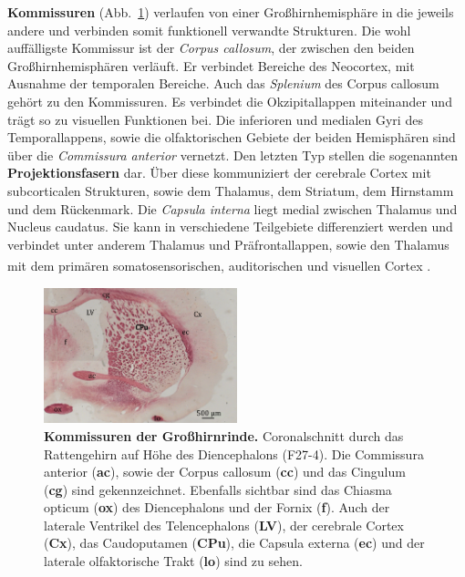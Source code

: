 \documentclass[12pt,a4paper,pdftex]{article}
\begin{document}
\noindent \textbf{Kommissuren} (Abb.~\ref{fig:faser_cortico-cortical}) verlaufen von einer Großhirnhemisphäre in die jeweils andere und verbinden somit funktionell verwandte Strukturen. Die wohl auffälligste Kommissur ist der \textit{Corpus callosum}, der zwischen den beiden Großhirnhemisphären verläuft. Er verbindet Bereiche des Neocortex, mit Ausnahme der temporalen Bereiche. Auch das \textit{Splenium} des Corpus callosum gehört zu den Kommissuren. Es verbindet die Okzipitallappen miteinander und trägt so zu visuellen Funktionen bei. Die inferioren und medialen Gyri des Temporallappens, sowie die olfaktorischen Gebiete der beiden Hemisphären sind über die \textit{Commissura anterior} vernetzt. Den letzten Typ stellen die sogenannten \textbf{Projektionsfasern} dar. Über diese kommuniziert der cerebrale Cortex mit subcorticalen Strukturen, sowie dem Thalamus, dem Striatum, dem Hirnstamm und dem Rückenmark. Die \textit{Capsula interna} liegt  medial zwischen Thalamus und Nucleus caudatus. Sie kann in verschiedene Teilgebiete differenziert werden und verbindet unter anderem Thalamus und Präfrontallappen, sowie den Thalamus mit dem primären somatosensorischen, auditorischen und visuellen Cortex \textsuperscript{\cite[13]{crossman2014neuroanatomy}}.

\begin{figure}[H]
    \centering
    \includegraphics[width=0.5\textwidth]{pictures/Bilder_Jule/Ratte/faser_cortex.png}
    \caption[Kommissuren der Großhirnrinde]{\textbf{Kommissuren der Großhirnrinde.} Coronalschnitt durch das Rattengehirn auf Höhe des Diencephalons (F27-4). Die Commissura anterior (\textbf{ac}), sowie der Corpus callosum (\textbf{cc}) und das Cingulum (\textbf{cg}) sind gekennzeichnet. Ebenfalls sichtbar sind das Chiasma opticum (\textbf{ox}) des Diencephalons und der Fornix (\textbf{f}). Auch der laterale Ventrikel des Telencephalons (\textbf{LV}), der cerebrale Cortex (\textbf{Cx}), das Caudoputamen (\textbf{CPu}), die Capsula externa (\textbf{ec}) und der laterale olfaktorische Trakt (\textbf{lo}) sind zu sehen.}
    \label{fig:faser_cortico-cortical}
\end{figure}
\end{document}
